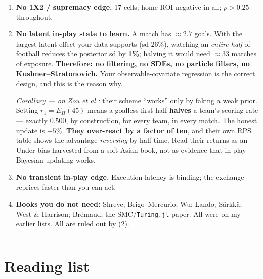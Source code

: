 \documentclass[11pt,a4paper]{article}
\begin{document}
\begin{closed}[title={SETTLED. DO NOT RE-OPEN. (I have proposed each of these to you at least once.)}]
\begin{enumerate}
\item \textbf{No 1X2 / supremacy edge.} 17 cells; home ROI negative in all; $p > 0.25$ throughout.

\item \textbf{No latent in-play state to learn.} A match has $\approx 2.7$ goals. With the largest latent
      effect your data supports (sd $26\%$), watching an \emph{entire half} of football reduces the posterior
      sd by \textbf{1\%}; halving it would need $\approx 33$ matches of exposure. \textbf{Therefore: no
      filtering, no SDEs, no particle filters, no Kushner--Stratonovich.} Your observable-covariate
      regression is the correct design, and this is the reason why.

      \emph{Corollary --- on Zou et al.:} their scheme ``works'' only by faking a weak prior. Setting
      $r_1 = E_H(45)$ means a goalless first half \textbf{halves} a team's scoring rate --- exactly $0.500$,
      by construction, for every team, in every match. The honest update is $-5\%$. \textbf{They over-react by
      a factor of ten}, and their own RPS table shows the advantage \emph{reversing} by half-time. Read their
      returns as an Under-bias harvested from a soft Asian book, not as evidence that in-play Bayesian
      updating works.

\item \textbf{No transient in-play edge.} Execution latency is binding; the exchange reprices faster than you
      can act.

\item \textbf{Books you do not need:} Shreve; Brigo--Mercurio; Wu; Lando; S\"arkk\"a; West \& Harrison;
      Br\'emaud; the SMC/\texttt{Turing.jl} paper. All were on my earlier lists. All are ruled out by (2).
\end{enumerate}
\end{closed}

\bigskip\hrule\bigskip

\section*{Reading list}
\end{document}
